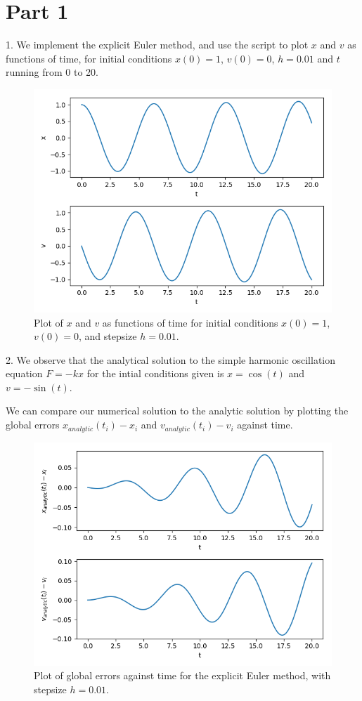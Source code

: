\documentclass[11pt]{article}
\begin{document}
\section*{Part 1}
1. We implement the explicit Euler method, and use the script to plot $x$ and $v$ as functions of time, for initial conditions $x(0) = 1$, $v(0) = 0$, $h = 0.01$ and $t$ running from 0 to 20.
\begin{figure}[htp]
\centering
\includegraphics[scale=0.54]{euler_plot.png}
\caption{Plot of $x$ and $v$ as functions of time for initial conditions $x(0) = 1$, $v(0) = 0$, and stepsize $h = 0.01$.}
\label{explicit}
\end{figure}
\newpage

2. We observe that the analytical solution to the simple harmonic oscillation equation $F = -kx$ for the intial conditions given is $x = \cos(t)$ and $v = -\sin(t)$.

We can compare our numerical solution to the analytic solution by plotting the global errors $x_{analytic}(t_i) - x_i$ and $v_{analytic}(t_i) - v_i$ against time.
\begin{figure}[htp]
\centering
\includegraphics[scale=0.70]{euler_err.png}
\caption{Plot of global errors against time for the explicit Euler method, with stepsize $h=0.01$.}
\label{expliciterror}
\end{figure}
\newpage
\end{document}

